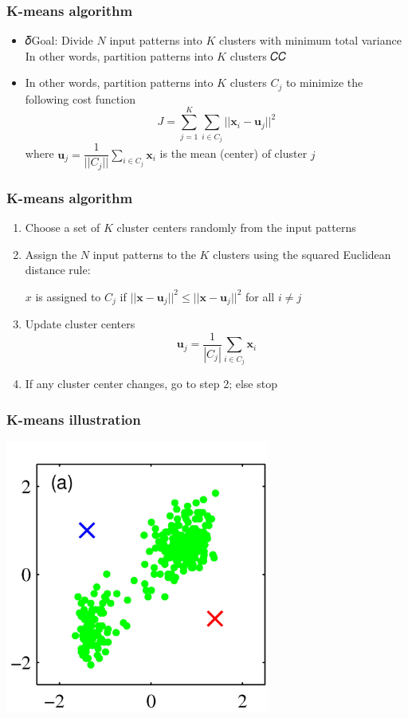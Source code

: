 \documentclass[12pt,notes,mathserif]{beamer}
\begin{document}
\begin{frame}[c]
	\frametitle{K-means algorithm}
	\begin{itemize}
		\item 𝛿Goal: Divide $N$ input patterns into $K$ clusters with minimum total variance In other words, partition patterns into $K$ clusters 𝐶𝐶
		\item In other words, partition patterns into $K$ clusters $C_j$ to minimize the following cost function
		      \[
			      J=\sum_{j=1}^K\sum_{i\in C_j} ||\mathbf{x}_i-\mathbf{u}_j||^2
		      \]
		      where $\mathbf{u}_j=\dfrac{1}{||C_j||}\sum_{i\in C_j}\mathbf{x}_i$ is  the mean (center) of cluster $j$
	\end{itemize}
\end{frame}

\begin{frame}[c]
	\frametitle{K-means algorithm}
	\begin{enumerate}
		\item Choose a set of $K$ cluster centers randomly from the input patterns
		\item Assign the $N$ input patterns to the $K$ clusters using the squared Euclidean distance rule:

		      $x$ is assigned to $C_j$ if $||\mathbf{x}-\mathbf{u}_j||^2\le ||\mathbf{x}-\mathbf{u}_j||^2$ for all $i\neq j$
		\item Update cluster centers
		      \[
			      \mathbf{u}_j=\frac{1}{|C_j|}\sum_{i\in C_j}\mathbf{x}_i
		      \]
		\item If any cluster center changes, go to step 2; else stop
	\end{enumerate}
\end{frame}



\begin{frame}[c]
	\frametitle{K-means illustration}
	\begin{center}
		\includegraphics[width=0.65\textwidth]{fig/lec718.jpg}
	\end{center}
\end{frame}
\end{document}
